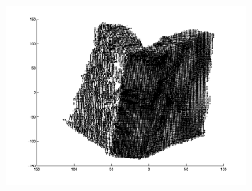 \begin{figure}
\begin{subfigure}[b]{0.3\textwidth}
		\includegraphics[width=\textwidth]{Images/Book3.png}
		\caption{}
	\end{subfigure}
	

\end{figure}
